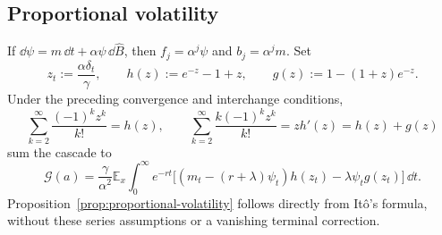 \documentclass[12pt]{article}
\newcommand{\E}{\mathbb{E}}
\newcommand{\hB}{\hat B}
\begin{document}
\subsection{Proportional volatility}

If \(\dd\psi=m\,\dd t+\alpha\psi\,\dd\hB\), then
\(f_j=\alpha^j\psi\) and \(b_j=\alpha^jm\). Set
\[
  z_t:=\frac{\alpha\delta_t}{\gamma},\qquad
  h(z):=e^{-z}-1+z,\qquad
  g(z):=1-(1+z)e^{-z}.
\]
Under the preceding convergence and interchange conditions,
\[
  \sum_{k=2}^\infty\frac{(-1)^kz^k}{k!}=h(z),
  \qquad
  \sum_{k=2}^\infty\frac{k(-1)^kz^k}{k!}
     =zh'(z)=h(z)+g(z)
\]
sum the cascade to
\begin{equation}\label{eq:proportional-sum}
  \mathcal G(a)=\frac{\gamma}{\alpha^2}
    \E_x\int_0^\infty e^{-rt}
    \bigl[(m_t-(r+\lambda)\psi_t)h(z_t)
          -\lambda\psi_tg(z_t)\bigr]\,\dd t.
\end{equation}
Proposition~\ref{prop:proportional-volatility} follows directly from
It\^o's formula, without these series assumptions or a vanishing
terminal correction.
\end{document}
